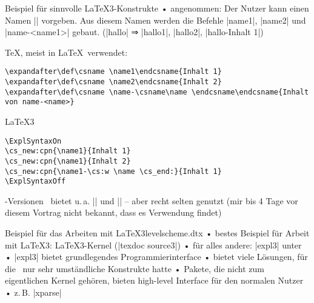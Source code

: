 \documentclass[t]{beamer}
\begin{document}
\begin{frame}[fragile]{Beispiel für sinnvolle \LaTeX3-Konstrukte}
• angenommen: Der Nutzer kann einen Namen |\name| vorgeben. Aus diesem Namen werden die Befehle |name1|, |name2| und |name-<name1>| gebaut. (|hallo| ⇒ |hallo1|, |hallo2|, |hallo-Inhalt 1|)
\•
\begin{block}{\TeX, meist in \LaTeX\ verwendet:}
\begin{verbatim}
\expandafter\def\csname \name1\endcsname{Inhalt 1}
\expandafter\def\csname \name2\endcsname{Inhalt 2}
\expandafter\def\csname \name-\csname\name \endcsname\endcsname{Inhalt von name-<name>}
\end{verbatim}
\end{block}

\begin{block}{\LaTeX3}
\begin{verbatim}
\ExplSyntaxOn
\cs_new:cpn{\name1}{Inhalt 1}
\cs_new:cpn{\name1}{Inhalt 2}
\cs_new:cpn{\name1-\cs:w \name \cs_end:}{Inhalt 1}
\ExplSyntaxOff
\end{verbatim}
\end{block}
\end{frame}

\begin{frame}[fragile]{\LaTeXe-Versionen}
\LaTeXe\ bietet u.\,a. |\@nameuse| und |\@namedef| – aber recht selten genutzt (mir bis 4 Tage vor diesem Vortrag nicht bekannt, dass es Verwendung findet)
\end{frame}

\begin{frame}[fragile]{Beispiel für das Arbeiten mit \LaTeX3}{levelscheme.dtx}
• bestes Beispiel für Arbeit mit \LaTeX3: \LaTeX3-Kernel (|texdoc source3|)
• für alles andere: |expl3| unter \LaTeXe
• |expl3| bietet grundlegendes Programmierinterface
• bietet viele Lösungen, für die \LaTeXe\ nur sehr umständliche Konstrukte hatte
• Pakete, die nicht zum eigentlichen Kernel gehören, bieten high-level Interface für den normalen Nutzer
• z.\,B. |xparse| 
\•
\end{frame}

\end{document}

